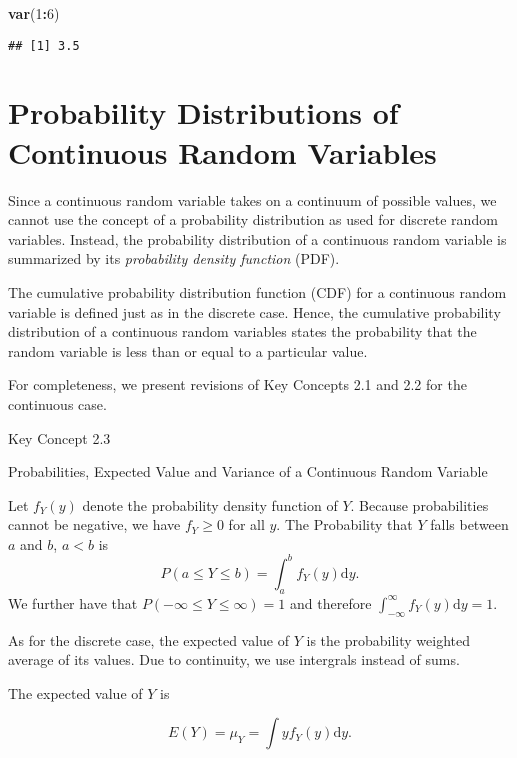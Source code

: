 \documentclass[]{book}
\newenvironment{Shaded}{\begin{snugshade}}{\end{snugshade}}
\newcommand{\KeywordTok}[1]{\textcolor[rgb]{0.13,0.29,0.53}{\textbf{#1}}}
\newcommand{\DecValTok}[1]{\textcolor[rgb]{0.00,0.00,0.81}{#1}}
\newcommand{\OperatorTok}[1]{\textcolor[rgb]{0.81,0.36,0.00}{\textbf{#1}}}
\newcommand{\NormalTok}[1]{#1}
\theoremstyle{definition}
\theoremstyle{definition}
\theoremstyle{definition}
\theoremstyle{remark}
\begin{document}
\begin{Shaded}
\begin{Highlighting}[]
\KeywordTok{var}\NormalTok{(}\DecValTok{1}\OperatorTok{:}\DecValTok{6}\NormalTok{)}
\end{Highlighting}
\end{Shaded}

\begin{verbatim}
## [1] 3.5
\end{verbatim}

\section{Probability Distributions of Continuous Random
Variables}\label{probability-distributions-of-continuous-random-variables}

Since a continuous random variable takes on a continuum of possible
values, we cannot use the concept of a probability distribution as used
for discrete random variables. Instead, the probability distribution of
a continuous random variable is summarized by its \emph{probability
density function} (PDF).

The cumulative probability distribution function (CDF) for a continuous
random variable is defined just as in the discrete case. Hence, the
cumulative probability distribution of a continuous random variables
states the probability that the random variable is less than or equal to
a particular value.

For completeness, we present revisions of Key Concepts 2.1 and 2.2 for
the continuous case.

Key Concept 2.3

Probabilities, Expected Value and Variance of a Continuous Random
Variable

Let \(f_Y(y)\) denote the probability density function of \(Y\). Because
probabilities cannot be negative, we have \(f_Y\geq 0\) for all \(y\).
The Probability that \(Y\) falls between \(a\) and \(b\), \(a < b\) is
\[ P(a \leq Y \leq b) = \int_a^b f_Y(y) \mathrm{d}y. \] We further have
that \(P(-\infty \leq Y \leq \infty) = 1\) and therefore
\(\int_{-\infty}^{\infty} f_Y(y) \mathrm{d}y = 1\).

As for the discrete case, the expected value of \(Y\) is the probability
weighted average of its values. Due to continuity, we use intergrals
instead of sums.

The expected value of \(Y\) is

\[ E(Y) =  \mu_Y = \int y f_Y(y) \mathrm{d}y. \]
\end{document}
